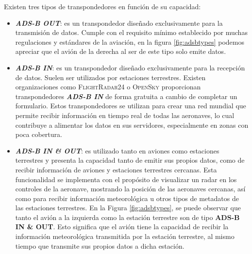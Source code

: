 \documentclass[a4paper, 11pt]{book}
\begin{document}
Existen tres tipos de transpondedores en función de su capacidad:
\begin{itemize}
	\item \textbf{\emph{ADS-B OUT}}: es un transpondedor diseñado exclusivamente para la transmisión de datos. Cumple con el requisito mínimo establecido por muchas regulaciones y estándares de la aviación, en la figura \ref{fig:adsbtypes} podemos apreciar que el avión de la derecha al ser de este tipo solo emite datos.
	\item \textbf{\emph{ADS-B IN}}: es un transpondedor diseñado exclusivamente para la recepción de datos. Suelen ser utilizados por estaciones terrestres. Existen organizaciones como \textsc{FlightRadar24} o \textsc{OpenSky} proporcionan transpondedores \textbf{\emph{ADS-B IN}} de forma gratuita a cambio de completar un formulario. Estos transpondedores se utilizan para crear una red mundial que permite recibir información en tiempo real de todas las aeronaves, lo cual contribuye a alimentar los datos en sus servidores, especialmente en zonas con poca cobertura.
	\item \textbf{\emph{ADS-B IN \& OUT}}: es utilizado tanto en aviones como estaciones terrestres y presenta la capacidad tanto de emitir sus propios datos, como de recibir información de aviones y estaciones terrestres cercanas. Esta funcionalidad se implementa con el propósito de visualizar un radar en los controles de la aeronave, mostrando la posición de las aeronaves cercanas, así como para recibir información meteorológica u otros tipos de metadatos de las estaciones terrestres. En la Figura \ref{fig:adsbtypes}, se puede observar que tanto el avión a la izquierda como la estación terrestre son de tipo \textbf{ADS-B IN \& OUT}. Esto significa que el avión tiene la capacidad de recibir la información meteorológica transmitida por la estación terrestre, al mismo tiempo que transmite sus propios datos a dicha estación.
\end{itemize}
\end{document}
